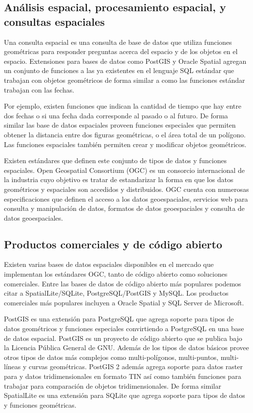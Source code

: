 \documentclass[final,fmstyle]{fpunathesis}
\begin{document}
\subsection{Análisis espacial, procesamiento espacial, y consultas espaciales}

Una consulta espacial es una consulta de base de datos que utiliza funciones geométricas para responder preguntas acerca del espacio y de los objetos en el espacio. Extensiones para bases de datos como PostGIS y Oracle Spatial agregan un conjunto de funciones a las ya existentes en el lenguaje SQL estándar que trabajan con objetos geométricos de forma similar a como las funciones estándar trabajan con las fechas. 

Por ejemplo, existen funciones que indican la cantidad de tiempo que hay entre dos fechas o si una fecha dada corresponde al pasado o al futuro. De forma similar las base de datos espaciales proveen funciones especiales que permiten obtener la distancia entre dos figuras geométricas, o el área total de un polígono. Las funciones espaciales también permiten crear y modificar objetos geométricos.

Existen estándares que definen este conjunto de tipos de datos y funciones espaciales. Open Geospatial Consortium (OGC) es un consorcio internacional de la industria cuyo objetivo es tratar de estandarizar la forma en que los datos geométricos y espaciales son accedidos y distribuidos. OGC cuenta con numerosas especificaciones que definen el acceso a los datos geoespaciales, servicios web para consulta y manipulación de datos, formatos de datos geoespaciales y consulta de datos geoespaciales.

\subsection{Productos comerciales y de código abierto}

Existen varias bases de datos espaciales disponibles en el mercado que implementan los estándares OGC, tanto de código abierto como soluciones comerciales. Entre las bases de datos de código abierto más populares podemos citar a SpatialLite/SQLite, PostgreSQL/PostGIS y MySQL. Los productos comerciales más populares incluyen a Oracle Spatial y SQL Server de Microsoft.

PostGIS es una extensión para PostgreSQL que agrega soporte para tipos de datos geométricos y funciones especiales convirtiendo a PostgreSQL en una base de datos espacial. PostGIS es un proyecto de código abierto que se publica bajo la Licencia Pública General de GNU. Además de los tipos de datos básicos provee otros tipos de datos más complejos como multi-polígonos, multi-puntos, multi-líneas y curvas geométricas. PostGIS 2 además agrega soporte para datos raster para  y datos tridimensionales en formato TIN así como también funciones para trabajar para comparación de objetos tridimensionales. De forma similar SpatialLite es una extensión para SQLite que agrega soporte para tipos de datos y funciones geométricas.
\end{document}
